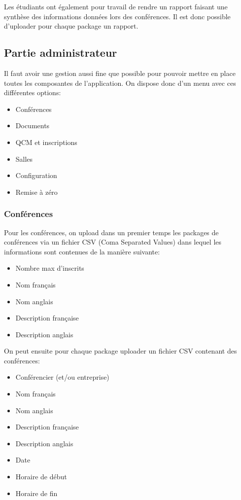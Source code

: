 Les étudiants ont également pour travail de rendre un rapport faisant une synthèse des informations données lors des conférences.
Il est donc possible d'uploader pour chaque package un rapport.

        \subsection{Partie administrateur}

Il faut avoir une gestion aussi fine que possible pour pouvoir mettre en place toutes les composantes de l'application.
On dispose donc d'un menu avec ces différentes options:

    \begin{itemize}
    \item Conférences
    \item Documents
    \item QCM et inscriptions
    \item Salles
    \item Configuration
    \item Remise à zéro
    \end{itemize}

            \subsubsection{Conférences}

Pour les conférences, on upload dans un premier temps les packages de conférences via un fichier CSV (Coma Separated Values)
dans lequel les informations sont contenues de la manière suivante:

    \begin{itemize}
    \item Nombre max d'inscrits
    \item Nom français
    \item Nom anglais
    \item Description française
    \item Description anglais
    \end{itemize}

On peut ensuite pour chaque package uploader un fichier CSV contenant des conférences:

    \begin{itemize}
    \item Conférencier (et/ou entreprise)
    \item Nom français
    \item Nom anglais
    \item Description française
    \item Description anglais
    \item Date
    \item Horaire de début
    \item Horaire de fin
    \end{itemize}

